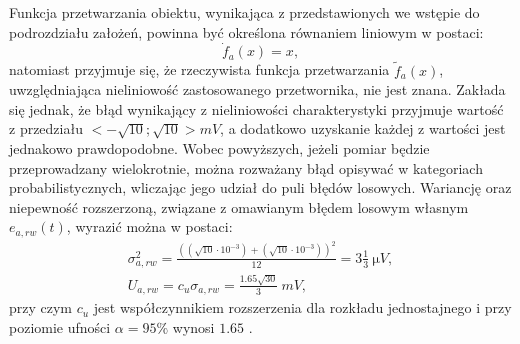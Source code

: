 Funkcja przetwarzania obiektu, wynikająca z przedstawionych we wstępie do podrozdziału założeń, powinna być określona równaniem liniowym w postaci:
\begin{equation}
\dot{f}_{a} \left( x \right) = x \label{eqn_sym_parta_statfun},
\end{equation}
natomiast przyjmuje się, że rzeczywista funkcja przetwarzania $\tilde{f}_{a}(x)$, uwzględniająca nieliniowość zastosowanego przetwornika, nie jest znana. Zakłada się jednak, że błąd wynikający z nieliniowości charakterystyki przyjmuje wartość z przedziału $<-\sqrt{10};\sqrt{10}>\unit{mV}$, a dodatkowo uzyskanie każdej z wartości jest jednakowo prawdopodobne. Wobec powyższych, jeżeli pomiar będzie przeprowadzany wielokrotnie, można rozważany błąd opisywać w kategoriach probabilistycznych, wliczając jego udział do puli błędów losowych. Wariancję oraz niepewność rozszerzoną, związane z omawianym błędem losowym własnym $e_{a,rw}(t)$, wyrazić można w postaci:
\begin{gather}
\sigma_{a,rw}^{2} = \frac{\left( \left( \sqrt{10} \cdot 10^{-3} \right) + \left( \sqrt{10} \cdot 10^{-3} \right) \right)^{2}}{12} = 3 \frac{1}{3} ~\unit{\micro V} \label{eqn_sym_parta_rand_self_var}, \\
U_{a,rw} = c_{u} \sigma_{a,rw} = \frac{1.65 \sqrt{30}}{3} ~\unit{mV} \label{eqn_sym_parta_rand_self_unc},
\end{gather}
przy czym $c_{u}$ jest współczynnikiem rozszerzenia dla rozkładu jednostajnego i przy poziomie ufności $\alpha = 95\%$ wynosi $1.65$ \cite{jcgm_guide}.


